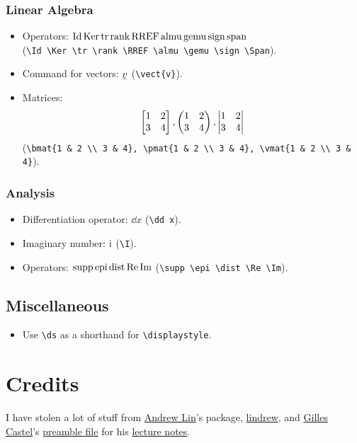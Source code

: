 \documentclass[10pt,letterpaper]{amsart}
\begin{document}
\subsubsection*{Linear Algebra}
\begin{itemize} 
  \item Operators: \(\operatorname{Id} \operatorname{Ker} \operatorname{tr} \operatorname{rank} \operatorname{RREF} \operatorname{almu} \operatorname{gemu} \operatorname{sign} \operatorname{span}\) \\
    (\verb|\Id \Ker \tr \rank \RREF \almu \gemu \sign \Span|). 
  \item Command for vectors: \(\vect{v}\) (\verb|\vect{v}|).
  \item Matrices: \[
    \begin{bmatrix} 1 & 2 \\ 3 & 4 \end{bmatrix}, \begin{pmatrix} 1 & 2 \\ 3 & 4 \end{pmatrix}, \begin{vmatrix} 1 & 2 \\ 3 & 4 \end{vmatrix}
  \]
  (\verb|\bmat{1 & 2 \\ 3 & 4}, \pmat{1 & 2 \\ 3 & 4}, \vmat{1 & 2 \\ 3 & 4}|). 
\end{itemize}

\subsubsection*{Analysis}
\begin{itemize} 
  \item Differentiation operator: \(\dd x\) (\verb|\dd x|).
  \item Imaginary number: \(\mathrm{i}\) (\verb|\I|).
  \item Operators: \(\operatorname{supp} \operatorname{epi} \operatorname{dist} \operatorname{Re} \operatorname{Im}\) (\verb|\supp \epi \dist \Re \Im|).
\end{itemize}


\subsection{Miscellaneous}
\begin{itemize}
  \item Use \verb|\ds| as a shorthand for \verb|\displaystyle|. 
\end{itemize}


\section{Credits}
I have stolen a lot of stuff from \href{https://web.stanford.edu/~lindrew/}{Andrew Lin}'s package, \href{https://web.stanford.edu/~lindrew/lindrew.sty}{lindrew}, and \href{https://github.com/gillescastel}{Gilles Castel}'s \href{https://github.com/gillescastel/lecture-notes/blob/master/algebraic-topology/preamble.tex}{preamble file} for his \href{https://github.com/gillescastel/lecture-notes}{lecture notes}. 
\end{document}
